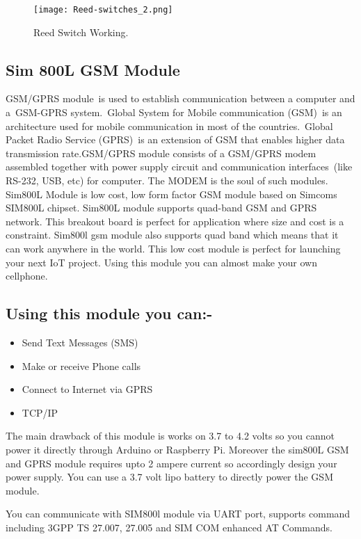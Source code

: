\begin{figure}[h]
	\centering
	\texttt{[image: Reed-switches\_2.png]}
	\caption{Reed Switch Working.}
\end{figure}

\subsection{Sim 800L GSM Module}
GSM/GPRS module is used to establish communication between a computer and
a GSM-GPRS system. Global System for Mobile communication (GSM) is an
architecture used for mobile communication in most of the countries. Global Packet
Radio Service (GPRS) is an extension of GSM that enables higher data transmission
rate.GSM/GPRS module consists of a GSM/GPRS modem assembled together
with power supply circuit and communication interfaces (like RS-232, USB, etc) for
computer. The MODEM is the soul of such modules.\\
Sim800L Module is low cost, low form factor GSM module based on Simcoms SIM800L chipset. Sim800L module supports quad-band GSM and GPRS network.
This breakout board is perfect for application where size and cost is a constraint. Sim800l gsm module also supports quad band which means that it can work anywhere in the world. This low cost module is perfect for launching your next IoT project. Using this module you can almost make your own cellphone. 

\subsection*{Using this module you can:-}
\begin{itemize}
	\item Send Text Messages (SMS)
	\item Make or receive Phone calls
	\item Connect to Internet via GPRS
	\item TCP/IP
\end{itemize}

The main drawback of this module is works on 3.7 to 4.2 volts so you cannot power it directly through Arduino or Raspberry Pi. Moreover the sim800L GSM and GPRS module requires upto 2 ampere current so accordingly design your power supply. You can use a 3.7 volt lipo battery to directly power the GSM module.\vspace{.3cm}

You can communicate with SIM800l module via UART port, supports command including 3GPP TS 27.007, 27.005 and SIM COM enhanced AT Commands.

